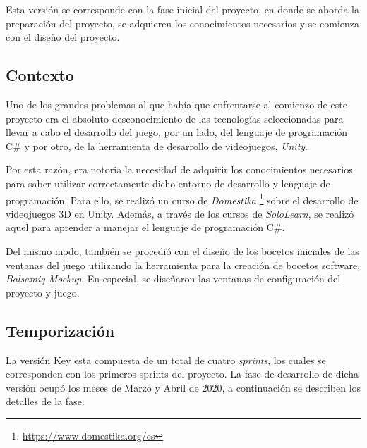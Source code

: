 Esta versión se corresponde con la fase inicial del proyecto, en donde se aborda la preparación del proyecto, se adquieren los conocimientos necesarios y se comienza con el diseño del proyecto.

\subsection{Contexto}
\label{sec:ContextoKey}

Uno de los grandes problemas al que había que enfrentarse al comienzo de este proyecto era el absoluto desconocimiento de las tecnologías seleccionadas para llevar a cabo el desarrollo del juego, por un lado, del lenguaje de programación C\# y por otro, de la herramienta de desarrollo de videojuegos, \emph{Unity}.

Por esta razón, era notoria la necesidad de adquirir los conocimientos necesarios para saber utilizar correctamente dicho entorno de desarrollo y lenguaje de programación. Para ello, se realizó un curso de \emph{Domestika} \footnote{\url{https://www.domestika.org/es}} sobre el desarrollo de videojuegos 3D en Unity. Además, a través de los cursos de \emph{SoloLearn}, se realizó aquel para aprender a manejar el lenguaje de programación C\#.

Del mismo modo, también se procedió con el diseño de los bocetos iniciales de las ventanas del juego utilizando la herramienta para la creación de bocetos software, \emph{Balsamiq Mockup}. En especial, se diseñaron las ventanas de configuración del proyecto y juego.

\subsection{Temporización}
\label{sec:TemporizacionKey}

La versión Key esta compuesta de un total de cuatro \emph{sprints}, los cuales se corresponden con los primeros sprints del proyecto. La fase de desarrollo de dicha versión ocupó los meses de Marzo y Abril de 2020, a continuación se describen los detalles de la fase:

